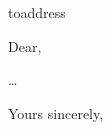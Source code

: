\documentclass[]{stvhoey-letter}  %
\begin{document}
       
\begin{letter}{toaddress}

\opening{Dear,}
\ldots
 
 \closing{Yours sincerely,} 

 \end{letter} 
 
\end{document}

